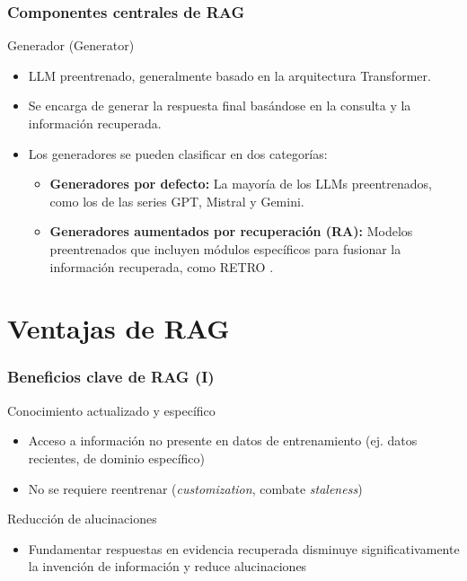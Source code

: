 \documentclass[handout]{beamer}
\begin{document}
\begin{frame}
  \frametitle{Componentes centrales de RAG}
  \begin{block}{Generador (Generator)}
  \begin{itemize}
    \item LLM preentrenado, generalmente basado en la arquitectura Transformer.
    \item Se encarga de generar la respuesta final basándose en la consulta y la información recuperada.
    \item Los generadores se pueden clasificar en dos categorías:
  \begin{itemize}
    \item \textbf{Generadores por defecto:} La mayoría de los LLMs preentrenados, como los de las series GPT, Mistral y Gemini. 
    \item \textbf{Generadores aumentados por recuperación (RA):} Modelos preentrenados que incluyen módulos específicos para fusionar la información recuperada, como RETRO \parencite{Borgeaud2021Improving}.
  \end{itemize}
  \end{itemize}
  \end{block}
\end{frame}

\section{Ventajas de RAG}

\begin{frame}
  \frametitle{Beneficios clave de RAG (I)}
  \begin{block}{Conocimiento actualizado y específico}
    \begin{itemize}
        \item Acceso a información no presente en datos de entrenamiento (ej. datos recientes, de dominio específico)
        \item No se requiere reentrenar (\textit{customization}, combate \textit{staleness})
    \end{itemize}
  \end{block}
  \begin{block}{Reducción de alucinaciones}
    \begin{itemize}
      \item Fundamentar respuestas en evidencia recuperada disminuye significativamente la invención de información y reduce alucinaciones \parencite{Lewis2020RAG, Shuster2021Retrieval, Dai2024RetrievalAugmented}
    \end{itemize}
  \end{block}
\end{frame}
\end{document}
